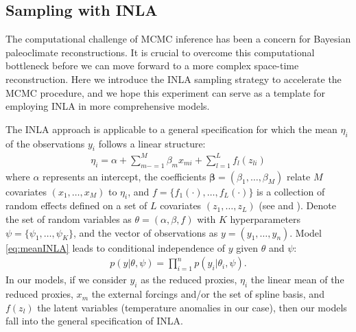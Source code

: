 \documentclass[12pt]{amsart}
\theoremstyle{plain}
\theoremstyle{definition}
\theoremstyle{remark}
\newcommand{\bl}[1]{\color{ForestGreen}\textbf{[Bo: #1]}\normalcolor}
\begin{document}
\subsection{Sampling with INLA}

The computational challenge of MCMC inference has been a concern for Bayesian paleoclimate reconstructions. It is crucial to overcome this computational bottleneck before we can move forward to a more complex space-time reconstruction. Here we introduce the INLA sampling strategy to accelerate the MCMC procedure, and we hope this experiment can serve as a template for employing INLA in more comprehensive models. 


The INLA approach is applicable to a general specification for which the mean $\eta_i$ of the observations $y_i$ follows a linear structure:
\begin{align}\label{eq:meanINLA}
  \eta_i = \alpha +\sum_{m-=1}^M\beta_mx_{mi}+\sum_{l=1}^Lf_l(z_{li})
\end{align}
where $\alpha$ represents an intercept, the coefficients
$\mathbf{\beta} = (\beta_1,\ldots,\beta_M)$ relate $M$ covariates
$(x_1,\ldots,x_M)$ to $\eta_i$, and $f = \{f_1(\cdot),\ldots,f_L(\cdot)\}$ is a collection of
random effects defined on a set of $L$ covariates $(z_1,\ldots,z_L)$ (see
\cite{Rue2009} and \cite{Blangiardo2013}). 
Denote the set of random variables as
$\theta = (\alpha,\beta,f)$ with $K$ hyperparameters $\psi =
\{\psi_1,\ldots,\psi_K\}$, and the vector of observations as $y=(y_1,\ldots,y_n)$. Model \eqref{eq:meanINLA} leads to conditional independence of $y$ given $\theta$ and $\psi$:
\begin{align*}
  p(y|\theta,\psi)=\prod_{i=1}^np(y_i|\theta_i,\psi).
\end{align*}
In our models, if we consider $y_i$ as the reduced proxies,  $\eta_i$ the
linear mean of the reduced proxies, $x_m$ the external forcings and/or the set
of spline basis, and $f(z_l)$ the latent variables (temperature anomalies in
our case), then our models fall into the general specification of INLA. 
\end{document}
